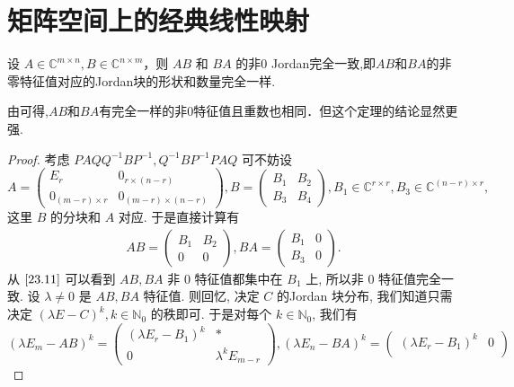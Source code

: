 \documentclass[../../main.tex]{subfiles}
\begin{document}
\section{矩阵空间上的经典线性映射}

\begin{theorem}\label{theorem:AB和BA的非0Jordan完全一致}
设 \( A \in \mathbb{C}^{m \times n}, B \in \mathbb{C}^{n \times m} \)，则 \( AB \) 和 \( BA \) 的非0 Jordan完全一致,即$AB$和$BA$的非零特征值对应的Jordan块的形状和数量完全一样.
\end{theorem}
\begin{remark}
由可得,$AB$和$BA$有完全一样的非$0$特征值且重数也相同．但这个定理的结论显然更强.
\end{remark}
\begin{proof}
考虑 \( PAQQ^{-1}BP^{-1}, Q^{-1}BP^{-1}PAQ \) 可不妨设
\[
A = \begin{pmatrix}
E_r & 0_{r \times (n - r)} \\
0_{(m - r) \times r} & 0_{(m - r) \times (n - r)}
\end{pmatrix}, B = \begin{pmatrix}
B_1 & B_2 \\
B_3 & B_4
\end{pmatrix}, B_1 \in \mathbb{C}^{r \times r}, B_3 \in \mathbb{C}^{(n - r) \times r},
\]
这里 \( B \) 的分块和 \( A \) 对应. 于是直接计算有
\begin{align}
AB = \begin{pmatrix}
B_1 & B_2 \\
0 & 0
\end{pmatrix}, BA = \begin{pmatrix}
B_1 & 0 \\
B_3 & 0
\end{pmatrix}. \label{23.11}
\end{align}
从 \(\eqref{23.11}\) 可以看到 \( AB, BA \) 非 0 特征值都集中在 \( B_1 \) 上, 所以非 0 特征值完全一致. 设 \( \lambda \neq 0 \) 是 \( AB, BA \) 特征值. 则回忆, 决定 \( C \) 的Jordan 块分布, 我们知道只需决定 \( (\lambda E - C)^k, k \in \mathbb{N}_0 \) 的秩即可. 于是对每个 \( k \in \mathbb{N}_0 \), 我们有
\[
(\lambda E_m - AB)^k = \begin{pmatrix}
(\lambda E_r - B_1)^k & * \\
0 & \lambda^k E_{m - r}
\end{pmatrix}, (\lambda E_n - BA)^k = \begin{pmatrix}
(\lambda E_r - B_1)^k & 0 \\

\end{pmatrix}\]
\end{proof}
\end{document}

